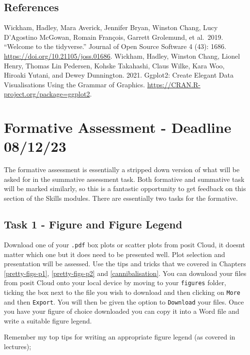 \documentclass[
]{book}
\begin{document}
\hypertarget{references-7}{%
\section{References}\label{references-7}}

Wickham, Hadley, Mara Averick, Jennifer Bryan, Winston Chang, Lucy D'Agostino McGowan, Romain François, Garrett Grolemund, et al.~2019. ``Welcome to the tidyverse.'' Journal of Open Source Software 4 (43): 1686. \url{https://doi.org/10.21105/joss.01686}.
Wickham, Hadley, Winston Chang, Lionel Henry, Thomas Lin Pedersen, Kohske Takahashi, Claus Wilke, Kara Woo, Hiroaki Yutani, and Dewey Dunnington. 2021. Ggplot2: Create Elegant Data Visualisations Using the Grammar of Graphics. \url{https://CRAN.R-project.org/package=ggplot2}.

\hypertarget{formative}{%
\chapter{Formative Assessment - Deadline 08/12/23}\label{formative}}

The formative assessment is essentially a stripped down version of what will be asked for in the summative assessment task. Both formative and summative task will be marked similarly, so this is a fantastic opportunity to get feedback on this section of the Skills modules. There are essentially two tasks for the formative.

\hypertarget{task-1}{%
\section{Task 1 - Figure and Figure Legend}\label{task-1}}

Download one of your \texttt{.pdf} box plots or scatter plots from posit Cloud, it doesnt matter which one but it does need to be presented well. Plot selection and presentation will be assessed. Use the tips and tricks that we covered in Chapters \ref{pretty-figs-p1}, \ref{pretty-figs-p2} and \ref{cannibalisation}. You can download your files from posit Cloud onto your local device by moving to your \texttt{figures} folder, ticking the box next to the file you wish to download and then clicking on \texttt{More} and then \texttt{Export}. You will then be given the option to \texttt{Download} your files. Once you have your figure of choice downloaded you can copy it into a Word file and write a suitable figure legend.

Remember my top tips for writing an appropriate figure legend (as covered in lectures);
\end{document}
